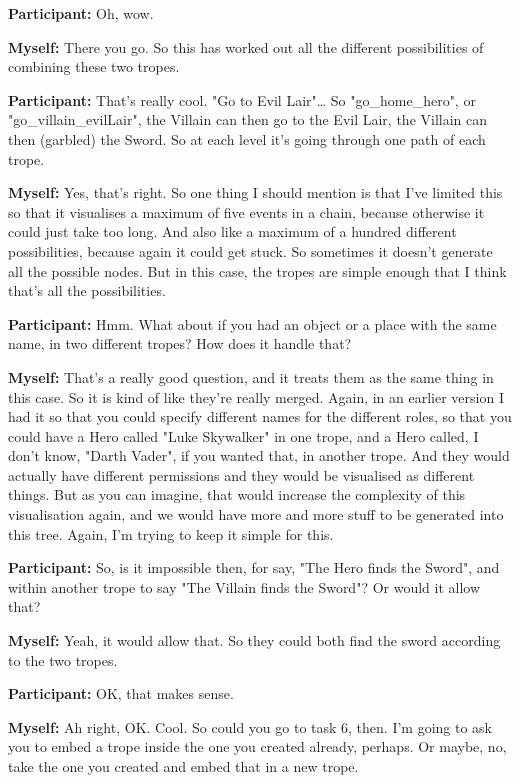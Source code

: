\documentclass[11pt]{report}
\begin{document}
\begin{linenumbers}
\textbf{Participant:} Oh, wow.

\textbf{Myself:} There you go. So this has worked out all the different possibilities of combining these two tropes.

\textbf{Participant:} That's really cool. "Go to Evil Lair"\ldots{} So "go_home_hero", or "go_villain_evilLair", the Villain can then go to the Evil Lair, the Villain can then (garbled) the Sword. So at each level it's going through one path of each trope.

\textbf{Myself:} Yes, that's right. So one thing I should mention is that I've limited this so that it visualises a maximum of five events in a chain, because otherwise it could just take too long. And also like a maximum of a hundred different possibilities, because again it could get stuck. So sometimes it doesn't generate all the possible nodes. But in this case, the tropes are simple enough that I think that's all the possibilities.

\textbf{Participant:} Hmm. What about if you had an object or a place with the
same name, in two different tropes? How does it handle that?

\textbf{Myself:} That's a really good question, and it treats them as the same thing in this case. So it is kind of like they're really merged. Again, in an earlier version I had it so that you could specify different names for the different roles, so that you could have a Hero called "Luke Skywalker" in one trope, and a Hero called, I don't know, "Darth Vader", if you wanted that, in another trope. And they would actually have different permissions and they would be visualised as different things. But as you can imagine, that would increase the complexity of this visualisation again, and we would have more and more stuff to be generated into this tree. Again, I'm trying to keep it simple for this.

\textbf{Participant:} So, is it impossible then, for say, "The Hero finds the Sword", and within another trope to say "The Villain finds the Sword"? Or would it allow that?

\textbf{Myself:} Yeah, it would allow that. So they could both find the sword according to the two tropes.

\textbf{Participant:} OK, that makes sense.

\textbf{Myself:} Ah right, OK. Cool. So could you go to task 6, then. I'm going to ask you to embed a trope inside the one you created already, perhaps. Or maybe, no, take the one you created and embed that in a new trope.


\end{linenumbers}
\end{document}
